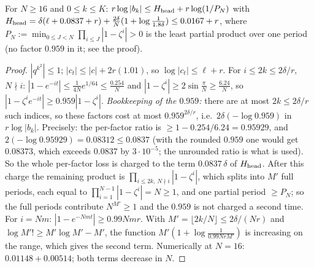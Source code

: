 \documentclass[11pt]{article}
\theoremstyle{definition}\newtheorem{definition}[theorem]{Definition}
\theoremstyle{remark}\newtheorem{remark}[theorem]{Remark}
\begin{document}
\begin{lemma}\label{lem:head}
For $N\ge16$ and $0\le k\le K$: $r\log|b_k|\le H_{\rm head}+r\log(1/P_N)$ with $H_{\rm head}=\delta(\ell+0.0837+r)+\frac{2\delta}N(1+\log\frac1{1.8\delta})\le0.0167+r$, where $P_N:=\min_{0\le J<N}\prod_{i\le J}|1-\zeta^i|>0$ is the least partial product over one period (no factor $0.959$ in it; see the proof).
\end{lemma}
\begin{proof}
$|q^{k^2}|\le1$; $|c_t|\le|c|+2r(1.01)$, so $\log|c_t|\le\ell+r$. For $i\le2k\le2\delta/r$, $N\nmid i$: $|1-e^{-it}|\le\frac1{4N}e^{1/64}\le\frac{0.254}N$ and $|1-\zeta^i|\ge2\sin\frac\pi N\ge\frac{6.24}N$, so $|1-\zeta^ie^{-it}|\ge0.959|1-\zeta^i|$. \emph{Bookkeeping of the $0.959$:} there are at most $2k\le2\delta/r$ such indices, so these factors cost at most $0.959^{2\delta/r}$, i.e.\ $2\delta(-\log0.959)$ in $r\log|b_k|$. Precisely: the per-factor ratio is $\ge1-0.254/6.24=0.95929$, and $2(-\log0.95929)=0.08312\le0.0837$ (with the rounded $0.959$ one would get $0.08373$, which exceeds $0.0837$ by $3\cdot10^{-5}$; the unrounded ratio is what is used). So the whole per-factor loss is charged to the term $0.0837\,\delta$ of $H_{\rm head}$. After this charge the remaining product is $\prod_{i\le2k,\,N\nmid i}|1-\zeta^i|$, which splits into $M'$ full periods, each equal to $\prod_{i=1}^{N-1}|1-\zeta^i|=N\ge1$, and one partial period $\ge P_N$; so the full periods contribute $N^{M'}\ge1$ and the $0.959$ is not charged a second time. For $i=Nm$: $|1-e^{-Nmt}|\ge0.99Nmr$. With $M'=\lfloor2k/N\rfloor\le2\delta/(Nr)$ and $\log M'!\ge M'\log M'-M'$, the function $M'(1+\log\frac1{0.99NrM'})$ is increasing on the range, which gives the second term. Numerically at $N=16$: $0.01148+0.00514$; both terms decrease in $N$.
\end{proof}
\end{document}
